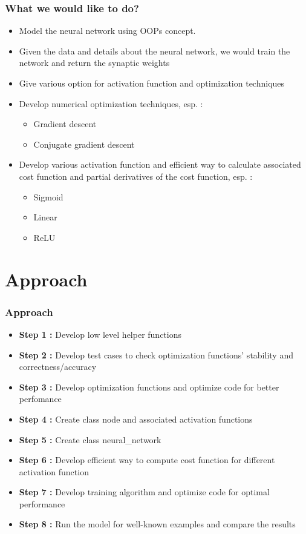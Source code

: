 \documentclass[10pt]{beamer}
\begin{document}
\begin{frame}
\frametitle{What we would like to do?}
\begin{itemize}
\item{Model the neural network using OOPs concept.}
\item{Given the data and details about the neural network, we would train the network
and return the synaptic weights}
\item{Give various option for activation function and optimization techniques}
\item{Develop numerical optimization techniques, esp. :}
	\begin{itemize}
	\item{Gradient descent}
	\item{Conjugate gradient descent}
	\end{itemize}
\item{Develop various activation function and efficient way to calculate associated 
cost function and partial derivatives of the cost function, esp. :}
	\begin{itemize}
	\item{Sigmoid}
	\item{Linear}
	\item{ReLU}
	\end{itemize}	
\end{itemize}
\end{frame}

\section{Approach}

\begin{frame}
\frametitle{Approach}
\begin{itemize}
\item{ \textbf{Step 1 : } Develop low level helper functions}
\item{ \textbf{Step 2 : } Develop test cases to check optimization functions' stability and correctness/accuracy}
\item{ \textbf{Step 3 : } Develop optimization functions and optimize code for better perfomance}
\item{ \textbf{Step 4 : } Create class node and associated activation functions}
\item{ \textbf{Step 5 : } Create class neural\_network}
\item{ \textbf{Step 6 : } Develop efficient way to compute cost function for different activation function}
\item{ \textbf{Step 7 : } Develop training algorithm and optimize code for optimal performance}
\item{ \textbf{Step 8 : } Run the model for well-known examples and compare the results}
\end{itemize}
\end{frame}
\end{document}
